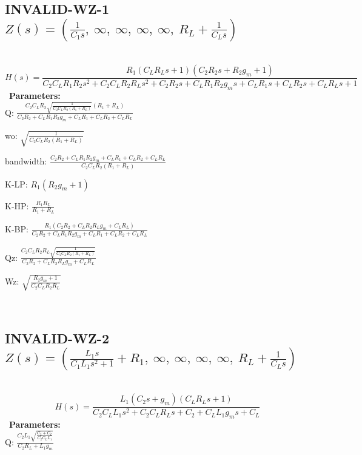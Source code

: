 \documentclass{article}
\begin{document}
\subsection{INVALID-WZ-1 $Z(s) = \left( \frac{1}{C_{1} s}, \  \infty, \  \infty, \  \infty, \  \infty, \  R_{L} + \frac{1}{C_{L} s}\right)$ } \ 
\textbf{\[H(s) = \frac{R_{1} \left(C_{L} R_{L} s + 1\right) \left(C_{2} R_{2} s + R_{2} g_{m} + 1\right)}{C_{2} C_{L} R_{1} R_{2} s^{2} + C_{2} C_{L} R_{2} R_{L} s^{2} + C_{2} R_{2} s + C_{L} R_{1} R_{2} g_{m} s + C_{L} R_{1} s + C_{L} R_{2} s + C_{L} R_{L} s + 1}\] } \ 
\textbf{Parameters:}\\ 

Q: $\frac{C_{2} C_{L} R_{2} \sqrt{\frac{1}{C_{2} C_{L} R_{2} \left(R_{1} + R_{L}\right)}} \left(R_{1} + R_{L}\right)}{C_{2} R_{2} + C_{L} R_{1} R_{2} g_{m} + C_{L} R_{1} + C_{L} R_{2} + C_{L} R_{L}}$\ 

wo: $\sqrt{\frac{1}{C_{2} C_{L} R_{2} \left(R_{1} + R_{L}\right)}}$\ 

bandwidth: $\frac{C_{2} R_{2} + C_{L} R_{1} R_{2} g_{m} + C_{L} R_{1} + C_{L} R_{2} + C_{L} R_{L}}{C_{2} C_{L} R_{2} \left(R_{1} + R_{L}\right)}$\ 

K-LP: $R_{1} \left(R_{2} g_{m} + 1\right)$\ 

K-HP: $\frac{R_{1} R_{L}}{R_{1} + R_{L}}$\ 

K-BP: $\frac{R_{1} \left(C_{2} R_{2} + C_{L} R_{2} R_{L} g_{m} + C_{L} R_{L}\right)}{C_{2} R_{2} + C_{L} R_{1} R_{2} g_{m} + C_{L} R_{1} + C_{L} R_{2} + C_{L} R_{L}}$\ 

Qz: $\frac{C_{2} C_{L} R_{2} R_{L} \sqrt{\frac{1}{C_{2} C_{L} R_{2} \left(R_{1} + R_{L}\right)}}}{C_{2} R_{2} + C_{L} R_{2} R_{L} g_{m} + C_{L} R_{L}}$\ 

Wz: $\sqrt{\frac{R_{2} g_{m} + 1}{C_{2} C_{L} R_{2} R_{L}}}$\ 

\ 

\subsection{INVALID-WZ-2 $Z(s) = \left( \frac{L_{1} s}{C_{1} L_{1} s^{2} + 1} + R_{1}, \  \infty, \  \infty, \  \infty, \  \infty, \  R_{L} + \frac{1}{C_{L} s}\right)$ } \ 
\textbf{\[H(s) = \frac{L_{1} \left(C_{2} s + g_{m}\right) \left(C_{L} R_{L} s + 1\right)}{C_{2} C_{L} L_{1} s^{2} + C_{2} C_{L} R_{L} s + C_{2} + C_{L} L_{1} g_{m} s + C_{L}}\] } \ 
\textbf{Parameters:}\\ 

Q: $\frac{C_{2} L_{1} \sqrt{\frac{C_{2} + C_{L}}{C_{2} C_{L} L_{1}}}}{C_{2} R_{L} + L_{1} g_{m}}$\ 
\end{document}

